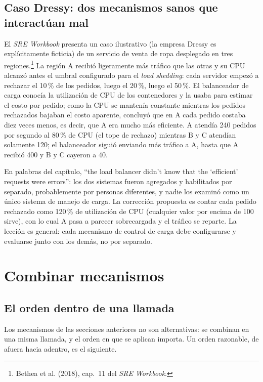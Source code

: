 \documentclass[variant=apuntes,cover=institutional,mode=screen]{ua-engineering-v6-article}
\begin{document}
\subsection{Caso Dressy: dos mecanismos sanos que interactúan mal}

El \emph{SRE Workbook} presenta un caso ilustrativo (la empresa Dressy es explícitamente ficticia) de un servicio de venta de ropa desplegado en tres regiones.\footnote{Bethea et al. (2018), cap.~11 del \emph{SRE Workbook}.} La región A recibió ligeramente más tráfico que las otras y su CPU alcanzó antes el umbral configurado para el \emph{load shedding}: cada servidor empezó a rechazar el 10\,\% de los pedidos, luego el 20\,\%, luego el 50\,\%. El balanceador de carga conocía la utilización de CPU de los contenedores y la usaba para estimar el costo por pedido; como la CPU se mantenía constante mientras los pedidos rechazados bajaban el costo aparente, concluyó que en A cada pedido costaba diez veces menos, es decir, que A era mucho más eficiente. A atendía 240 pedidos por segundo al 80\,\% de CPU (el tope de rechazo) mientras B y C atendían solamente 120; el balanceador siguió enviando más tráfico a A, hasta que A recibió 400 y B y C cayeron a 40.

En palabras del capítulo, ``the load balancer didn't know that the `efficient' requests were errors'': los dos sistemas fueron agregados y habilitados por separado, probablemente por personas diferentes, y nadie los examinó como un único sistema de manejo de carga. La corrección propuesta es contar cada pedido rechazado como 120\,\% de utilización de CPU (cualquier valor por encima de 100 sirve), con lo cual A pasa a parecer sobrecargada y el tráfico se reparte. La lección es general: cada mecanismo de control de carga debe configurarse y evaluarse junto con los demás, no por separado.

\section{Combinar mecanismos}\label{sec:combinar}

\subsection{El orden dentro de una llamada}

Los mecanismos de las secciones anteriores no son alternativas: se combinan en una misma llamada, y el orden en que se aplican importa. Un orden razonable, de afuera hacia adentro, es el siguiente.
\end{document}
